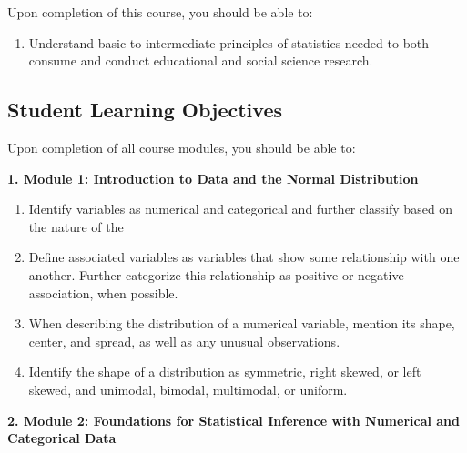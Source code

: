 \documentclass[
]{article}
\providecommand{\tightlist}{%
  \setlength{\itemsep}{0pt}\setlength{\parskip}{0pt}}
\begin{document}
Upon completion of this course, you should be able to:

\begin{enumerate}
\def\labelenumi{\arabic{enumi}.}
\tightlist
\item
  Understand basic to intermediate principles of statistics needed to
  both consume and conduct educational and social science research.
\end{enumerate}

\subsection{Student Learning Objectives}

Upon completion of all course modules, you should be able to:

\textbf{1. Module 1: Introduction to Data and the Normal Distribution}

\begin{enumerate}
\def\labelenumi{\arabic{enumi}.}
\tightlist
\item
  Identify variables as numerical and categorical and further classify
  based on the nature of the
\item
  Define associated variables as variables that show some relationship
  with one another. Further categorize this relationship as positive or
  negative association, when possible.
\item
  When describing the distribution of a numerical variable, mention its
  shape, center, and spread, as well as any unusual observations.
\item
  Identify the shape of a distribution as symmetric, right skewed, or
  left skewed, and unimodal, bimodal, multimodal, or uniform.
\end{enumerate}

\vspace{.25cm}

\textbf{2. Module 2: Foundations for Statistical Inference with
Numerical and Categorical Data}
\end{document}
